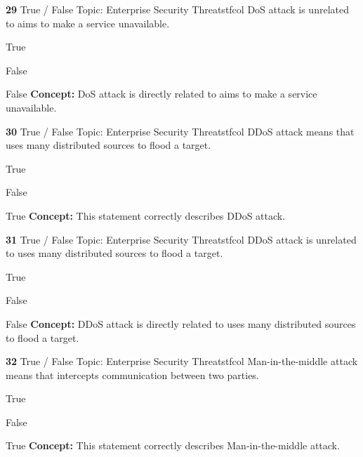 \documentclass[10pt,a4paper]{article}
\begin{document}
\begin{qcard}{\color{white}\textbf{29} \hfill \small True / False \textbar{} Topic: Enterprise Security Threats}{tfcol}
DoS attack is unrelated to aims to make a service unavailable.

\begin{qoptions}
\item True
\item False
\end{qoptions}
\begin{explainbox}{False}
\textbf{Concept:} DoS attack is directly related to aims to make a service unavailable.
\end{explainbox}
\end{qcard}

\begin{qcard}{\color{white}\textbf{30} \hfill \small True / False \textbar{} Topic: Enterprise Security Threats}{tfcol}
DDoS attack means that uses many distributed sources to flood a target.

\begin{qoptions}
\item True
\item False
\end{qoptions}
\begin{explainbox}{True}
\textbf{Concept:} This statement correctly describes DDoS attack.
\end{explainbox}
\end{qcard}

\begin{qcard}{\color{white}\textbf{31} \hfill \small True / False \textbar{} Topic: Enterprise Security Threats}{tfcol}
DDoS attack is unrelated to uses many distributed sources to flood a target.

\begin{qoptions}
\item True
\item False
\end{qoptions}
\begin{explainbox}{False}
\textbf{Concept:} DDoS attack is directly related to uses many distributed sources to flood a target.
\end{explainbox}
\end{qcard}

\begin{qcard}{\color{white}\textbf{32} \hfill \small True / False \textbar{} Topic: Enterprise Security Threats}{tfcol}
Man-in-the-middle attack means that intercepts communication between two parties.

\begin{qoptions}
\item True
\item False
\end{qoptions}
\begin{explainbox}{True}
\textbf{Concept:} This statement correctly describes Man-in-the-middle attack.
\end{explainbox}
\end{qcard}
\end{document}
